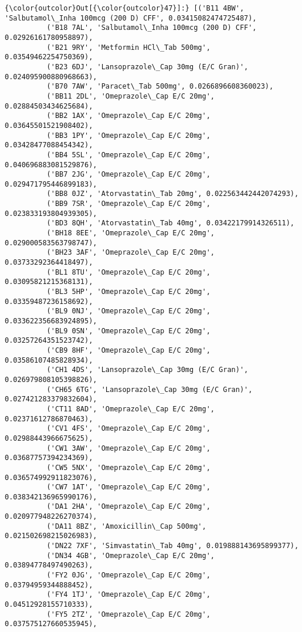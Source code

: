 \documentclass[11pt]{article}
\begin{document}
\begin{Verbatim}[commandchars=\\\{\}]
{\color{outcolor}Out[{\color{outcolor}47}]:} [('B11 4BW', 'Salbutamol\_Inha 100mcg (200 D) CFF', 0.03415082474725487),
          ('B18 7AL', 'Salbutamol\_Inha 100mcg (200 D) CFF', 0.02926161780958897),
          ('B21 9RY', 'Metformin HCl\_Tab 500mg', 0.03549462254750369),
          ('B23 6DJ', 'Lansoprazole\_Cap 30mg (E/C Gran)', 0.024095900880968663),
          ('B70 7AW', 'Paracet\_Tab 500mg', 0.0266896608360023),
          ('BB11 2DL', 'Omeprazole\_Cap E/C 20mg', 0.02884503434625684),
          ('BB2 1AX', 'Omeprazole\_Cap E/C 20mg', 0.03645501521908402),
          ('BB3 1PY', 'Omeprazole\_Cap E/C 20mg', 0.03428477088454342),
          ('BB4 5SL', 'Omeprazole\_Cap E/C 20mg', 0.040696883081529876),
          ('BB7 2JG', 'Omeprazole\_Cap E/C 20mg', 0.029471795446899183),
          ('BB8 0JZ', 'Atorvastatin\_Tab 20mg', 0.022563442442074293),
          ('BB9 7SR', 'Omeprazole\_Cap E/C 20mg', 0.023833193804939305),
          ('BD3 8QH', 'Atorvastatin\_Tab 40mg', 0.03422179914326511),
          ('BH18 8EE', 'Omeprazole\_Cap E/C 20mg', 0.029000583563798747),
          ('BH23 3AF', 'Omeprazole\_Cap E/C 20mg', 0.03733292364418497),
          ('BL1 8TU', 'Omeprazole\_Cap E/C 20mg', 0.03095821215368131),
          ('BL3 5HP', 'Omeprazole\_Cap E/C 20mg', 0.03359487236158692),
          ('BL9 0NJ', 'Omeprazole\_Cap E/C 20mg', 0.033622356683924895),
          ('BL9 0SN', 'Omeprazole\_Cap E/C 20mg', 0.03257264351523742),
          ('CB9 8HF', 'Omeprazole\_Cap E/C 20mg', 0.03586107485828934),
          ('CH1 4DS', 'Lansoprazole\_Cap 30mg (E/C Gran)', 0.026979808105398826),
          ('CH65 6TG', 'Lansoprazole\_Cap 30mg (E/C Gran)', 0.027421283379832604),
          ('CT11 8AD', 'Omeprazole\_Cap E/C 20mg', 0.02371612786870463),
          ('CV1 4FS', 'Omeprazole\_Cap E/C 20mg', 0.02988443966675625),
          ('CW1 3AW', 'Omeprazole\_Cap E/C 20mg', 0.03687757394234369),
          ('CW5 5NX', 'Omeprazole\_Cap E/C 20mg', 0.036574992911823076),
          ('CW7 1AT', 'Omeprazole\_Cap E/C 20mg', 0.038342136965990176),
          ('DA1 2HA', 'Omeprazole\_Cap E/C 20mg', 0.020977948226270374),
          ('DA11 8BZ', 'Amoxicillin\_Cap 500mg', 0.021502698215026983),
          ('DN22 7XF', 'Simvastatin\_Tab 40mg', 0.019888143695899377),
          ('DN34 4GB', 'Omeprazole\_Cap E/C 20mg', 0.03894778497490263),
          ('FY2 0JG', 'Omeprazole\_Cap E/C 20mg', 0.03794959344888452),
          ('FY4 1TJ', 'Omeprazole\_Cap E/C 20mg', 0.04512928155710333),
          ('FY5 2TZ', 'Omeprazole\_Cap E/C 20mg', 0.037575127660535945),

\end{Verbatim}
\end{document}
